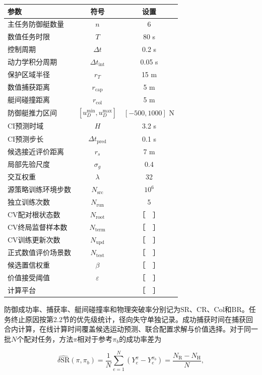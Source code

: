 \documentclass[
  11pt,
  fontset=none]{ctexart}
\begin{document}
\begin{longtable}[]{@{}lcc@{}}
\toprule\noalign{}
参数 & 符号 & 设置 \\
\midrule\noalign{}
\endhead
\bottomrule\noalign{}
\endlastfoot
主任务防御艇数量 & \(n\) & 6 \\
数值任务时限 & \(T\) & 80 s \\
控制周期 & \(\Delta t\) & 0.2 s \\
动力学积分周期 & \(\Delta t_{\mathrm{int}}\) & 0.05 s \\
保护区域半径 & \(r_T\) & 15 m \\
数值捕获距离 & \(r_{\mathrm{cap}}\) & 5 m \\
艇间碰撞距离 & \(r_{\mathrm{col}}\) & 5 m \\
防御艇推力区间 & \([u_D^{\min},u_D^{\max}]\) & \([-500,1000]\) N \\
CI预测时域 & \(H\) & 3.2 s \\
CI预测步长 & \(\Delta t_{\mathrm{pred}}\) & 0.1 s \\
候选接近评价距离 & \(r_s\) & 7 m \\
局部先验尺度 & \(\sigma_g\) & 0.4 \\
交互权重 & \(\lambda\) & 32 \\
源策略训练环境步数 & \(N_{\mathrm{src}}\) & \(10^6\) \\
独立训练次数 & \(N_{\mathrm{run}}\) & 5 \\
CV配对根状态数 & \(N_{\mathrm{root}}\) & ［　］ \\
CV终局监督样本数 & \(N_{\mathrm{term}}\) & ［　］ \\
CV训练更新次数 & \(N_{\mathrm{upd}}\) & ［　］ \\
正式数值评价场景数 & \(N_{\mathrm{test}}\) & ［　］ \\
候选置信权重 & \(\beta\) & ［　］ \\
价值接受阈值 & \(\varepsilon\) & ［　］ \\
计算平台 & & ［　］ \\
\end{longtable}

防御成功率、捕获率、艇间碰撞率和物理突破率分别记为\(\mathrm{SR}\)、\(\mathrm{CR}\)、\(\mathrm{Col}\)和\(\mathrm{BR}\)。任务终止原因按第2.2节的优先级统计，径向失守单独记录。成功捕获时间在捕获回合内计算，在线计算时间覆盖候选运动预测、联合配置求解与价值选择。对于同一批\(N\)个配对任务，方法\(\pi\)相对于参考\(\pi_b\)的成功率差为

\[
\widehat{\delta\mathrm{SR}}(\pi,\pi_b)
=\frac1N\sum_{e=1}^{N}
\left(Y_e^\pi-Y_e^{\pi_b}\right)
=\frac{N_{\mathrm R}-N_{\mathrm H}}{N},
\tag{31}
\]
\end{document}
